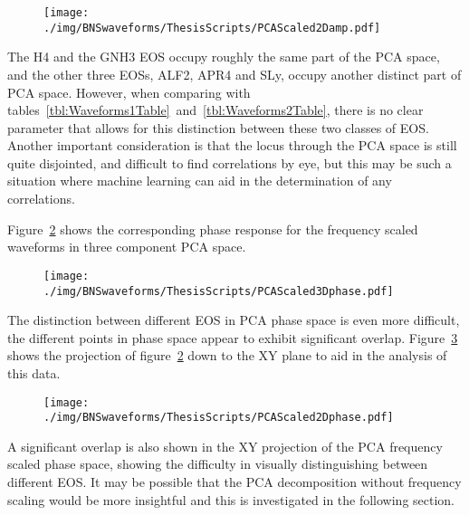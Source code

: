 \begin{figure}[H]
	\centering
	\texttt{[image: ./img/BNSwaveforms/ThesisScripts/PCAScaled2Damp.pdf]} 
	\caption[\protect]{\protect}
	\label{fig:PCAScaled2Damp}
\end{figure}
The H4 and the GNH3 EOS occupy roughly the same part of the PCA space, and the other three EOSs, ALF2, APR4 and SLy, occupy another distinct part of PCA space. However, when comparing  with tables~\ref{tbl:Waveforms1Table}~and~\ref{tbl:Waveforms2Table}, there is no clear parameter that allows for this distinction between these two classes of EOS. Another important consideration is that the locus through the PCA space is still quite disjointed, and difficult to find correlations by eye, but this may be such a situation where machine learning can aid in the determination of any correlations. \par 
Figure~\ref{fig:PCAScaled3Dphase} shows the corresponding phase response for the frequency scaled waveforms in three component PCA space.
\begin{figure}[H]
	\centering
	\texttt{[image: ./img/BNSwaveforms/ThesisScripts/PCAScaled3Dphase.pdf]} 
	\caption[\protect]{\protect}
	\label{fig:PCAScaled3Dphase}
\end{figure}
The distinction between different EOS in PCA phase space is even more difficult, the different points in phase space appear to exhibit significant overlap. Figure~\ref{fig:PCAScaled2Dphase} shows the projection of figure~\ref{fig:PCAScaled3Dphase} down to the XY plane to aid in the analysis of this data.
\begin{figure}[H]
	\centering
	\texttt{[image: ./img/BNSwaveforms/ThesisScripts/PCAScaled2Dphase.pdf]} 
	\caption[\protect]{\protect}
	\label{fig:PCAScaled2Dphase}
\end{figure}
A significant overlap is also shown in the XY projection of the PCA frequency scaled phase space, showing the difficulty in visually distinguishing between different EOS. It may be possible that the PCA decomposition without frequency scaling would be more insightful and this is investigated in the following section.\par

